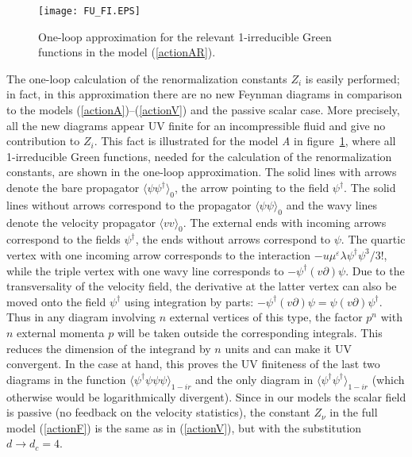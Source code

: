 \documentclass[12pt]{iopart}
\begin{document}
\begin{figure}
\begin{center}
\texttt{[image: FU\_FI.EPS]}
\caption{\label{fig:A}
One-loop approximation for the relevant 1-irreducible Green functions
in the model (\protect\ref{actionAR}).}
\end{center}
\end{figure}

The one-loop calculation of the renormalization constants $Z_{i}$ is easily
performed; in fact, in this approximation there are no new Feynman diagrams
in comparison to the models (\ref{actionA})--(\ref{actionV})
and the passive scalar case. More precisely, all the new diagrams appear UV
finite for an incompressible fluid and give no contribution to $Z_{i}$.
This fact is illustrated for the model {\it A} in figure~\ref{fig:A}, where
all 1-irreducible Green functions, needed for the calculation of the
renormalization constants, are shown in the one-loop approximation.
The solid lines with arrows denote the bare propagator
$\langle \psi\psi^{\dag} \rangle_{0}$, the arrow pointing to the field
$\psi^{\dag}$. The solid lines without arrows correspond to the propagator
$\langle \psi\psi \rangle_{0}$ and the wavy lines denote the velocity
propagator $\langle vv \rangle_{0}$. The external ends with incoming arrows
correspond to the fields $\psi^{\dag}$, the ends without arrows correspond
to $\psi$. The quartic vertex with one incoming arrow corresponds to the
interaction $- {u\mu^{\varepsilon} \lambda} \psi^{\dag}\psi^3/{3!}$, while
the triple vertex with one wavy line corresponds to
$-\psi^{\dag}(v\partial)\psi$. Due to the transversality of the velocity
field, the derivative at the latter vertex can also be moved onto the field
$\psi^{\dag}$ using integration by parts:
$-\psi^{\dag} (v\partial) \psi = \psi (v\partial) \psi^{\dag}$. Thus
in any diagram involving $n$ external vertices of this type, the factor
$p^{n}$ with $n$ external momenta $p$ will be taken outside the
corresponding integrals. This reduces the dimension of the integrand by
$n$ units and can make it UV convergent. In the case at hand, this proves
the UV finiteness of the last two diagrams in the function
$\langle \psi^{\dag}\psi\psi\psi \rangle_{1-ir}$ and the only diagram in
$\langle \psi^{\dag}\psi^{\dag} \rangle_{1-ir}$ (which otherwise would be
logarithmically divergent). Since in our models the scalar field is passive
(no feedback on the velocity statistics), the constant $Z_{\nu}$ in the
full model (\ref{actionF}) is the same as in (\ref{actionV}), but with the
substitution $d\to d_{c}=4$.
\end{document}

